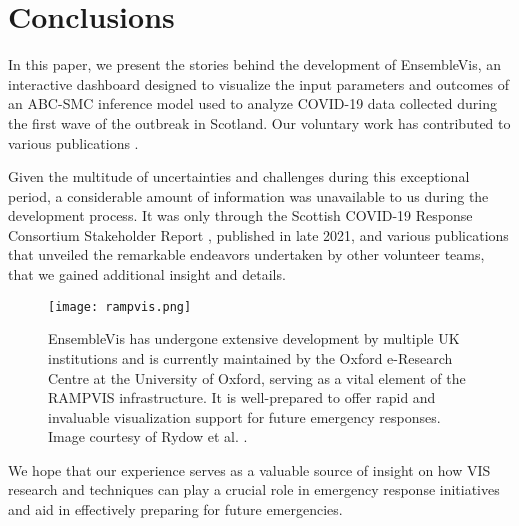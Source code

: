 \section{Conclusions}

In this paper, we present the stories behind the development of EnsembleVis, an interactive dashboard designed to visualize the input parameters and outcomes of an \ac{ABC-SMC} inference model used to analyze COVID-19 data collected during the first wave of the outbreak in Scotland. Our voluntary work has contributed to various publications \cite{chen2022RAMPVIS,dykes2022Visualizationb,khan2022Propagating,khan2022Rapid,rydow2023RAMPVIS}.

Given the multitude of uncertainties and challenges during this exceptional period, a considerable amount of information was unavailable to us during the development process. It was only through the Scottish COVID-19 Response Consortium Stakeholder Report \cite{abdalla2021Scottish}, published in late 2021, and various publications that unveiled the remarkable endeavors undertaken by other volunteer teams, that we gained additional insight and details.

\begin{figure}[tb!]
    \centering
    \texttt{[image: rampvis.png]}
    \caption{EnsembleVis has undergone extensive development by multiple UK institutions and is currently maintained by the Oxford e-Research Centre at the University of Oxford, serving as a vital element of the RAMPVIS infrastructure. It is well-prepared to offer rapid and invaluable visualization support for future emergency responses. Image courtesy of Rydow et al. \cite{rydow2023RAMPVIS}.
    }
    \label{fig:rampvis}

\end{figure}

We hope that our experience serves as a valuable source of insight on how VIS research and techniques can play a crucial role in emergency response initiatives and aid in effectively preparing for future emergencies.